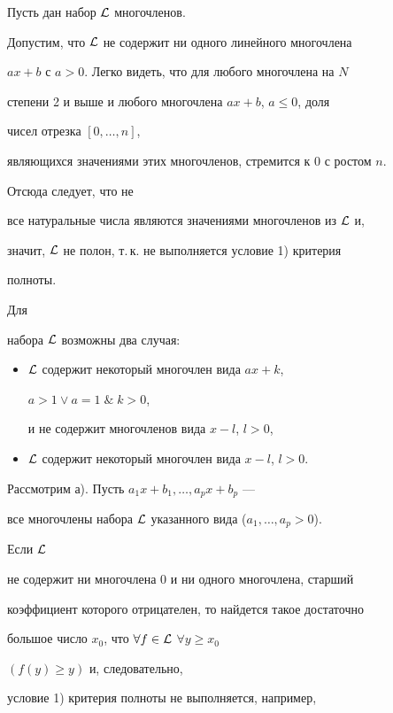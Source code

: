 \begin{pf} Пусть дан набор $\cal L$ многочленов. 


Допустим, что $\cal L$ не содержит ни одного линейного многочлена 


$ax+b$ с $a>0$. Легко видеть, что для любого многочлена на $N$ 


степени 2 и выше и любого многочлена $ax+b$, $a\le 0$, доля 


чисел отрезка $[0,\dotsc,n]$, 


являющихся значениями этих многочленов, стремится к 0 с ростом $n$. 


Отсюда следует, что не 


все натуральные числа являются значениями многочленов из $\cal L$ и, 


значит, $\cal L$ не полон, т.\,к. не выполняется условие 1) критерия 


полноты. 


 


Для 


набора $\cal L$ возможны два случая: 


\begin{itemize} 


\item[а)] $\cal L$ содержит некоторый многочлен вида $ax+k$, 


$a>1\vee a=1\;\&\;k>0$, 


и не содержит многочленов вида $x-l$, $l>0$, 


\item[б)] $\cal L$ содержит некоторый многочлен вида $x-l$, $l>0$. 


\end{itemize} 


 


Рассмотрим а). Пусть $a_1x+b_1,\dotsc,a_p x+b_p$ --- 


все многочлены набора $\cal L$ указанного вида ($a_1,\dotsc,a_p>0$).


Если $\cal L$ 


не содержит ни многочлена 0 и ни одного многочлена, старший 


коэффициент которого отрицателен, то найдется такое достаточно 


большое число $x_0$, что $\forall f\in\cal L$ $\forall y\ge x_0$ 


$(f(y)\ge y)$ и, следовательно, 


условие 1) критерия полноты не выполняется, например, 



\end{pf}
